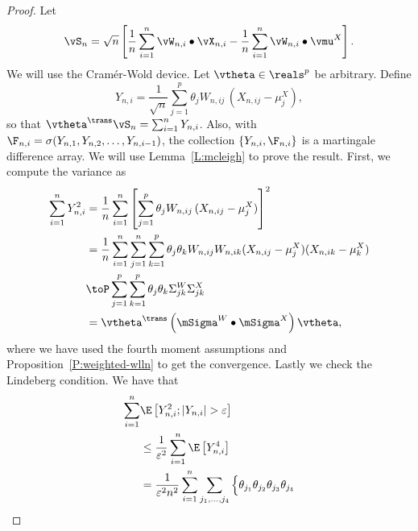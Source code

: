 \begin{proof}
    Let
    \[
        \vS_n
        =
        \sqrt{n} \left[ \frac{1}{n} \sum_{i=1}^n \vW_{n,i} \bullet \vX_{n,i}
            - \frac{1}{n} \sum_{i=1}^n \vW_{n,i} \bullet \vmu^X\right].
    \]
    We will use the Cram\'er-Wold device.  Let $\vtheta \in \reals^p$ be
    arbitrary.  Define
    \[
        Y_{n,i} 
        = 
        \frac{1}{\sqrt{n}}
        \sum_{j=1}^p
            \theta_j W_{n,ij} \, (X_{n,ij} - \mu^X_j),
    \]
    so that $\vtheta^\trans \vS_n = \sum_{i=1}^n Y_{n,i}$.  Also, with
    $\F_{n,i} = \sigma( Y_{n,1}, Y_{n,2}, \ldots, Y_{n,i-1})$, the collection
    $\{ Y_{n,i}, \F_{n,i} \}$ is a martingale difference array.  We will
    use Lemma~\ref{L:mcleigh} to prove the result.  First, we compute
    the variance as
    \begin{align*}
        \sum_{i=1}^n Y_{n,i}^2
        &=  \frac{1}{n}
            \sum_{i=1}^n
            \left[
                \sum_{j=1}^p
                    \theta_j W_{n,ij} \, (X_{n,ij} - \mu^X_j) 
            \right]^2 \\
        &=  \frac{1}{n}
            \sum_{i=1}^n
            \sum_{j=1}^n
            \sum_{k=1}^p
                \theta_j \theta_k
                W_{n,ij} W_{n,ik}
                (X_{n,ij} - \mu^X_j) (X_{n,ik} - \mu^X_k) \\
        &\toP \sum_{j=1}^p \sum_{k=1}^p
              \theta_j \theta_k
              \Sigma^W_{jk} \Sigma^X_{jk} \\
        &= \vtheta^\trans 
           \left(
               \mSigma^W
               \bullet
               \mSigma^X
           \right)
           \vtheta,
    \end{align*}
    where we have used  the fourth moment assumptions and
    Proposition~\ref{P:weighted-wlln} to get the convergence.  Lastly we check 
    the Lindeberg condition.  We have that
    \begin{align*}
        \sum_{i=1}^n
            &\E \left[ 
                Y_{n,i}^2 ; | Y_{n,i} | > \varepsilon
            \right] \\
        &\leq
            \frac{1}{\varepsilon^2}
            \sum_{i=1}^n
            \E \left[ 
                Y_{n,i}^4
            \right] \\
        &=
            \frac{1}{\varepsilon^2 n^2}
            \sum_{i=1}^n
            \sum_{j_1, \ldots, j_4}
                \Big\{
                 \theta_{j_1}
                 \theta_{j_2}
                 \theta_{j_3}
                 \theta_{j_4} 

\end{align*}
\end{proof}

